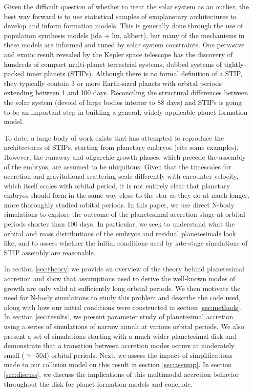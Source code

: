 \documentclass[twocolumn]{aastex63}
\begin{document}
Given the difficult question of whether to treat the solar system as an outlier, the best way forward is to use statistical samples of exoplanetary architectures to develop and inform formation models. This is generally done through the use of population synthesis models (ida + lin, alibert), but many of the mechanisms in these models are informed and tuned by solar system constraints. One pervasive and exotic result revealed by the Kepler space telescope has the discovery of hundreds of compact multi-planet terrestrial systems, dubbed systems of tightly-packed inner planets (STIPs). Although there is no formal definition of a STIP, they typically contain 3 or more Earth-sized planets with orbital periods extending between 1 and 100 days. Reconciling the structural differences between the solar system (devoid of large bodies interior to 88 days) and STIPs is going to be an important step in building a general, widely-applicable planet formation model.

To date, a large body of work exists that has attempted to reproduce the architectures of STIPs, starting from planetary embryos (cite some examples). However, the runaway and oligarchic growth phases, which precede the assembly of the embryos, are assumed to be ubiquitous. Given that the timescales for accretion and gravitational scattering scale differently with encounter velocity, which itself scales with orbital period, it is not entirely clear that planetary embryos should form in the same way close to the star as they do at much longer, more thoroughly studied orbital periods. In this paper, we use direct N-body simulations to explore the outcome of the planetesimal accretion stage at orbital periods shorter than 100 days. In particular, we seek to understand what the orbital and mass distributions of the embryos and residual planetesimals look like, and to assess whether the initial conditions used by late-stage simulations of STIP assembly are reasonable.

In section \ref{sec:theory} we provide an overview of the theory behind planetesimal accretion and show that assumptions used to derive the well-known modes of growth are only valid at sufficiently long orbital periods. We then motivate the need for N-body simulations to study this problem and describe the code used, along with how our initial conditions were constructed in section \ref{sec:methods}. In section \ref{sec:results}, we present parameter study of planetesimal accretion using a series of simulations of narrow annuli at various orbital periods. We also present a set of simulations starting with a much wider planetesimal disk and demonstrate that a transition between accretion modes occurs at moderately small ($\simeq$ 50d) orbital periods. Next, we assess the impact of simplifications made to our collision model on this result in section \ref{sec:assump}. In section \ref{sec:discuss}, we discuss the implications of this multimodal accretion behavior throughout the disk for planet formation models and conclude.
\end{document}
